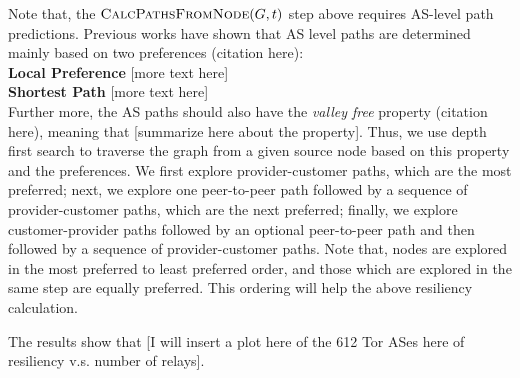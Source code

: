 Note that, the $\Call{CalcPathsFromNode}{G,t}$ step above requires AS-level path predictions. Previous works have shown that AS level paths are determined mainly based on two preferences (citation here):\\
\textbf{Local Preference} [more text here]\\
\textbf{Shortest Path} [more text here]\\
Further more, the AS paths should also have the \emph{valley free} property (citation here), meaning that  [summarize here about the property]. Thus, we use depth first search to traverse the graph from a given source node based on this property and the preferences. We first explore provider-customer paths, which are the most preferred; next, we explore one peer-to-peer path followed by a sequence of provider-customer paths, which are the next preferred; finally, we explore customer-provider paths followed by an optional peer-to-peer path and then followed by a sequence of provider-customer paths. Note that, nodes are explored in the most preferred to least preferred order, and those which are explored in the same step are equally preferred. This ordering will help the above resiliency calculation. 

\begin{algorithmic}
	\State [to be filled]
\EndFunction
\end{algorithmic}

The results show that [I will insert a plot here of the 612 Tor ASes here of resiliency v.s. number of relays].
